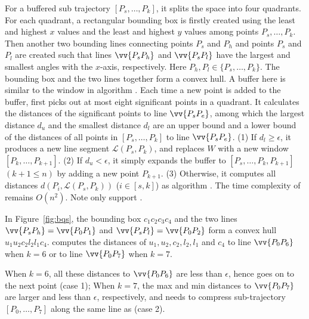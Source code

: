 For a buffered sub trajectory $[P_s, \ldots, P_k]$, it splits the space into four quadrants. For each quadrant, a rectangular bounding box is firstly created using the least and highest $x$ values and the least and highest $y$ values among points $P_s,\ldots,P_k$. Then another two bounding lines connecting points $P_s$ and $P_{h}$ and points $P_s$ and $P_{l}$ are created such that lines $\vv{P_sP_{h}}$ and $\vv{P_sP_{l}}$ have the largest and smallest angles with the $x$-axis, respectively.
Here $P_{h},P_{l} \in\{P_s,\ldots,P_k\}$. The bounding box and the two lines together form a convex hull.
A buffer here is similar to the window in algorithm \opwa\cite{Meratnia:Spatiotemporal}.
Each time a new point is added to the buffer, \bqsa first picks out at most eight significant points in a quadrant. It calculates the distances of the significant points to line $\vv{P_sP_e}$, among which the largest distance $d_{u}$ and the smallest distance $d_l$ are an upper bound and  a lower bound of the distances of all points in $[P_s, \ldots, P_k]$ to line $\vv{P_sP_e}$.
(1) If $d_l\ge \epsilon$, it produces a new line segment $\mathcal{L}(P_{s}, P_{k})$, and replaces $W$ with a new window $[P_{k},\ldots,P_{k+1}]$.
(2) If $d_u < \epsilon$, it simply expands the buffer to $[P_s, \ldots, P_k, P_{k+1}]$ $(k+1\le n)$ by adding a new point $P_{k+1}$.
(3) Otherwise, it computes all distances $d(P_i, {\mathcal{L}(P_s,P_k)})$ ($i\in[s, k]$) as algorithm \dpa.
The time complexity of \bqsa remains $O(n^2)$.
Note \bqsa only support \ped.

\begin{example}
\label{exm-alg-bqs}
In Figure~\ref{fig:bqs}, the bounding box $c_1c_2c_3c_4$ and the two lines $\vv{P_sP_{h}} = \vv{P_0P_1}$ and $\vv{P_sP_{l}} = \vv{P_0P_2}$ form a convex hull $u_1u_2c_2l_2l_1c_4$. \bqsa computes the distances of $u_1,u_2,c_2,l_2,l_1$ and $c_4$ to line $\vv{P_0P_6}$ when $k=6$ or to line $\vv{P_0P_7}$ when $k=7$.

When $k=6$, all these distances to $\vv{P_0P_6}$  are less than $\epsilon$, hence \bqsa goes on to the next point (case 1); When $k=7$,
the max and min distances to $\vv{P_0P_7}$ are larger and less than $\epsilon$, respectively, and \bqsa needs to compress sub-trajectory $[P_0, \ldots, P_7]$ along the same line as \dpa (case 2).
\end{example}




